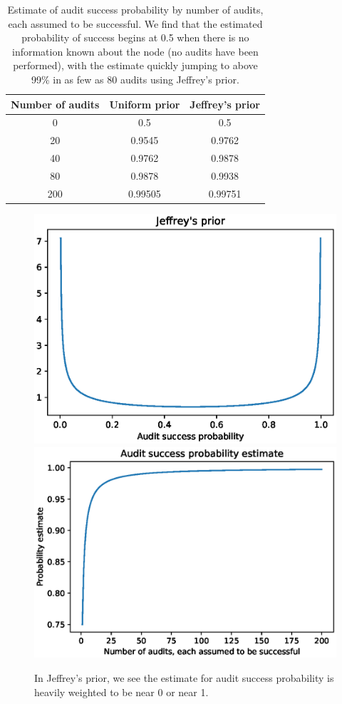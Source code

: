 \begin{table}[h]
\centering

\begin{tabular}{| c | c | c |}\hline
Number of audits & Uniform prior & Jeffrey's prior\\\hline
0 & 0.5 & 0.5 \\
20 & 0.9545 & 0.9762 \\
40 & 0.9762 & 0.9878 \\
80 & 0.9878 & 0.9938 \\
200 & 0.99505 & 0.99751 \\
\hline
\end{tabular}
\caption{Estimate of audit success probability by
number of audits, each assumed to be successful.
We find that the estimated probability of success begins at 0.5 when there is
no information known about the node (no audits have been performed),
with the estimate quickly jumping to above 99\% in as few as 80 audits using Jeffrey's prior.}
\end{table}

\begin{figure}[ht]
    \centering
    \includegraphics[scale=0.8]{audit-success/jeffrey_prior.eps}
    \includegraphics[scale=0.8]{audit-success/jeffrey_estimate.eps}
\caption{In Jeffrey's prior, we see the estimate for audit success probability is heavily weighted to be near 0 or near 1.}
\label{fig:jeff_prior}
\end{figure}

